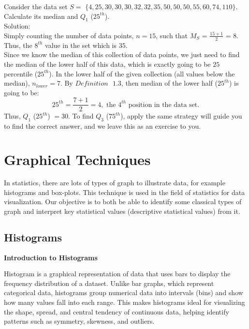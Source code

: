 \begin{example}
Consider the data set $S = $ $\{4, 25, 30, 30, 30, 32, 32, 35, 50, 50, 50, 55, 60, 74, 110\}$. Calculate its median and $Q_1$ ($25^{th}$).\\
Solution:\\
Simply counting the number of data points, $n = 15$, such that $M_{S}$ = $\frac{15 + 1}{2}$ = $8$. Thus, the $8^{th}$ value in the set which is $35$.\\
Since we know the median of this collection of data points, we just need to find the median of the lower half of this data, which is exactly going to be $25$ percentile ($25^{th}$). In the lower half of the given collection (all values below the median), $n_{lower} = 7$. By $Definition \text{ } 1.3$, then median of the lower half ($25^{th}$) is going to be: \[ 25^{th} = \frac{7+1}{2} = 4, \text{ the $4^{th}$ position in the data set}.\] Thus, $Q_1$ ($25^{th}$) $= 30$. To find $Q_3$ ($75^{th}$), apply the same strategy will guide you to find the correct answer, and we leave this as an exercise to you.
\end{example}

\section{Graphical Techniques}

In statistics, there are lots of types of graph to illustrate data, for example histograms and box-plots. This technique is used in the field of statistics for data visualization. Our objective is to both be able to identify some classical types of graph and interpret key statistical values (descriptive statistical values) from it.

\subsection{Histograms}

\textbf{Introduction to Histograms}

\noindent
Histogram is a graphical representation of data that uses bars to display the frequency distribution of a dataset. Unlike bar graphs, which represent categorical data, histograms group numerical data into intervals (bins) and show how many values fall into each range. This makes histograms ideal for visualizing the shape, spread, and central tendency of continuous data, helping identify patterns such as symmetry, skewness, and outliers.

